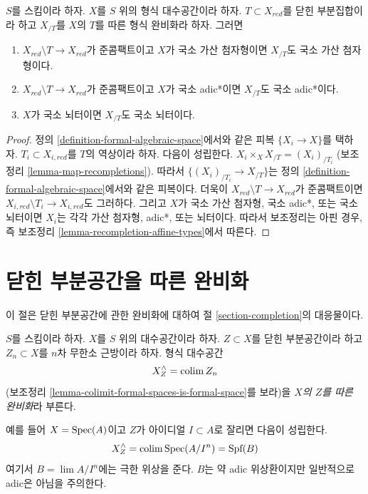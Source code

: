 \begin{lemma}
\label{lemma-recompletion-types}
$S$를 스킴이라 하자. $X$를 $S$ 위의 형식 대수공간이라 하자.
$T \subset X_{red}$를 닫힌 부분집합이라 하고 $X_{/T}$를
$X$의 $T$를 따른 형식 완비화라 하자. 그러면
\begin{enumerate}
\item $X_{red} \setminus T \to X_{red}$가 준콤팩트이고 $X$가
국소 가산 첨자형이면 $X_{/T}$도 국소 가산 첨자형이다.
\item $X_{red} \setminus T \to X_{red}$가 준콤팩트이고 $X$가
국소 adic*이면 $X_{/T}$도 국소 adic*이다.
\item $X$가 국소 뇌터이면 $X_{/T}$도 국소 뇌터이다.
\end{enumerate}
\end{lemma}

\begin{proof}
정의 \ref{definition-formal-algebraic-space}에서와 같은 피복
$\{X_i \to X\}$를 택하자.
$T_i \subset X_{i, red}$를 $T$의 역상이라 하자.
다음이 성립한다.
$X_i \times_X X_{/T} = (X_i)_{/T_i}$
(보조정리 \ref{lemma-map-recompletions}).
따라서 $\{(X_i)_{/T_i} \to X_{/T}\}$는 정의
\ref{definition-formal-algebraic-space}에서와 같은 피복이다.
더욱이 $X_{red} \setminus T \to X_{red}$가 준콤팩트이면
$X_{i, red} \setminus T_i \to X_{i, red}$도 그러하다.
그리고 $X$가 국소 가산 첨자형, 국소 adic*, 또는 국소 뇌터이면
$X_i$는 각각 가산 첨자형, adic*, 또는 뇌터이다.
따라서 보조정리는 아핀 경우, 즉 보조정리
\ref{lemma-recompletion-affine-types}에서 따른다.
\end{proof}

\section{닫힌 부분공간을 따른 완비화}
\label{section-completion-subspace}

\noindent
이 절은 닫힌 부분공간에 관한 완비화에 대하여 절
\ref{section-completion}의 대응물이다.

\begin{definition}
\label{definition-completion-subspace}
$S$를 스킴이라 하자. $X$를 $S$ 위의 대수공간이라 하자.
$Z \subset X$를 닫힌 부분공간이라 하고 $Z_n \subset X$를
$n$차 무한소 근방이라 하자. 형식 대수공간
$$
X^\wedge_Z = \mathop{\mathrm{colim}}\nolimits Z_n
$$
(보조정리 \ref{lemma-colimit-formal-spaces-is-formal-space}를 보라)을
{\it $X$의 $Z$를 따른 완비화}라 부른다.
\end{definition}

\noindent
예를 들어 $X = \mathop{\mathrm{Spec}}(A)$이고 $Z$가 아이디얼 $I \subset A$로
잘리면 다음이 성립한다.
$$
X^\wedge_Z = \mathop{\mathrm{colim}}\nolimits \mathop{\mathrm{Spec}}(A/I^n) = \text{Spf}(B)
$$
여기서 $B = \lim A/I^n$에는 극한 위상을 준다. $B$는 약 adic
위상환이지만 일반적으로 adic은 아님을 주의한다.

